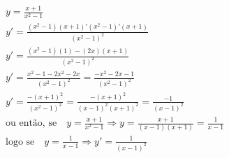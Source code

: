\begin{ex}
\begin{align}
&y=\frac{x+1}{x^2-1}\nonumber\\
&y'=\frac{(x^2-1)(x+1)'(x^2-1)'(x+1)}{(x^2-1)^2}\nonumber\\
&y'=\frac{(x^2-1)(1)-(2x)(x+1)}{(x^2-1)^2}\nonumber\\
&y'=\frac{x^2-1-2x^2-2x}{(x^2-1)^2}=\frac{-x^2-2x-1}{(x^2-1)^2}\nonumber\\
&y'=\frac{-(x+1)^2}{(x^2-1)^2}=\frac{-(x+1)^2}{(x-1)^2(x+1)^2}=\frac{-1}{(x-1)^2}\nonumber\\
&\text{ou então, se}\quad y=\frac{x+1}{x^2-1}\Rightarrow y=\frac{x+1}{(x-1)(x+1)}=\frac{1}{x-1}\nonumber\\
&\text{logo se}\quad y=\frac{1}{x-1} \Rightarrow y'=\frac{1}{(x-1)^2}\nonumber
\end{align}
\end{ex}